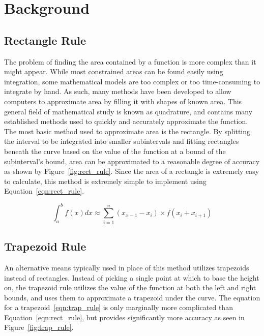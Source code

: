 \documentclass{paper}
\begin{document}
\thispagestyle{empty}
\insertTitlePage
\thispagestyle{empty}
\tableofcontents
\newpage
\setcounter{page}{1}

\section{Background}
\subsection{Rectangle Rule}
\noindent
The problem of finding the area contained by a function is more complex than it might appear.
While most constrained areas can be found easily using integration, some mathematical models are too complex or too time-consuming to integrate by hand.
As such, many methods have been developed to allow computers to approximate area by filling it with shapes of known area.
This general field of mathematical study is known as quadrature, and contains many established methods used to quickly and accurately approximate the function.
The most basic method used to approximate area is the rectangle.
By splitting the interval to be integrated into smaller subintervals and fitting rectangles beneath the curve based on the value of the function at a bound of the subinterval's bound, area can be approximated to a reasonable degree of accuracy as shown by Figure~\ref{fig:rect_rule}.
Since the area of a rectangle is extremely easy to calculate, this method is extremely simple to implement using Equation~\ref{eqn:rect_rule}.

\begin{equation}
    \label{eqn:rect_rule}
    \int_a^b f(x) dx \approx \sum_{i=1}^n (x_{x-1} - x_i) \times f(x_i + x_{i+1})
\end{equation}



\subsection{Trapezoid Rule}
\noindent
An alternative means typically used in place of this method utilizes trapezoids instead of rectangles.
Instead of picking a single point at which to base the height on, the trapezoid rule utilizes the value of the function at both the left and right bounds, and uses them to approximate a trapezoid under the curve.
The equation for a trapezoid~\eqref{eqn:trap_rule} is only marginally more complicated than Equation~\ref{eqn:rect_rule}, but provides significantly more accuracy as seen in Figure~\ref{fig:trap_rule}.
\end{document}
